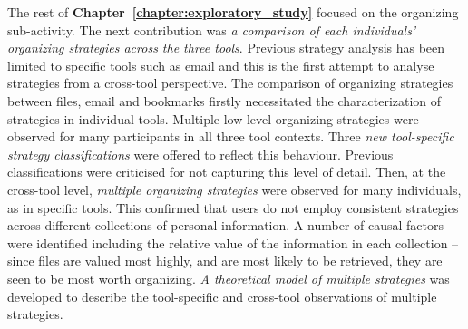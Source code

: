 The rest of \textbf{Chapter~\ref{chapter:exploratory_study}} focused on the organizing sub-activity.  The next contribution was \textit{a comparison of each individuals' organizing strategies across the three tools}. Previous strategy analysis has been limited to specific tools such as email and this is the first attempt to analyse strategies from a cross-tool perspective.  The comparison of organizing strategies between files, email and bookmarks firstly necessitated the characterization of strategies in individual tools. Multiple low-level organizing strategies were observed for many participants in all three tool contexts. Three \textit{new tool-specific strategy classifications} were offered to reflect this behaviour.  Previous classifications were criticised for not capturing this level of detail.  Then, at the cross-tool level, \textit{multiple organizing strategies} were observed for many individuals, as in specific tools.  This confirmed that users do not employ consistent strategies across different collections of personal information.  A number of causal factors were identified including the relative value of the information in each collection -- since files are valued most highly, and are most likely to be retrieved, they are seen to be most worth organizing.  \textit{A theoretical model of multiple strategies} was developed to describe the tool-specific and cross-tool observations of multiple strategies. %



